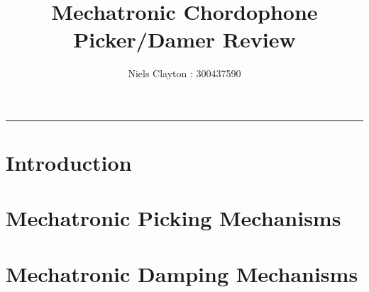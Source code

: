 \documentclass[a4paper,11pt]{article}
\begin{document}
\title{\LARGE{\textbf{Mechatronic Chordophone Picker/Damer Review}}}
\author{Niels Clayton : 300437590}
\date{}
\maketitle
\hrule

\section{Introduction}

\section{Mechatronic Picking Mechanisms}

\section{Mechatronic Damping Mechanisms}
\end{document}

